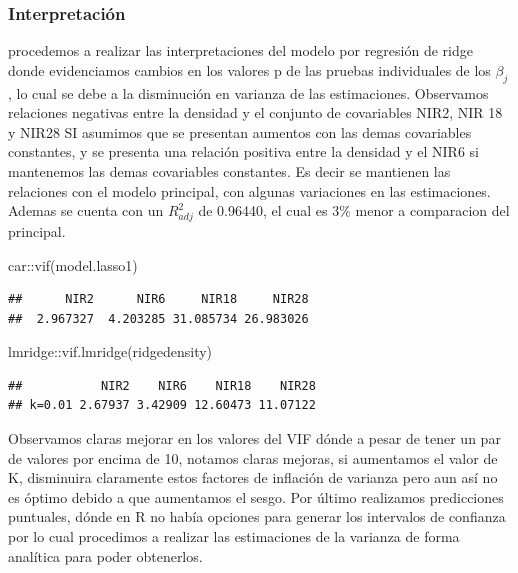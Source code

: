 \documentclass[
]{article}
\newenvironment{Shaded}{\begin{snugshade}}{\end{snugshade}}
\newcommand{\FunctionTok}[1]{\textcolor[rgb]{0.00,0.00,0.00}{#1}}
\newcommand{\NormalTok}[1]{#1}
\newcommand{\SpecialCharTok}[1]{\textcolor[rgb]{0.00,0.00,0.00}{#1}}
\begin{document}
\hypertarget{interpretaciuxf3n-1}{%
\subsubsection{Interpretación}\label{interpretaciuxf3n-1}}

procedemos a realizar las interpretaciones del modelo por regresión de
ridge donde evidenciamos cambios en los valores p de las pruebas
individuales de los \(\beta_{j}\), lo cual se debe a la disminución en
varianza de las estimaciones. Observamos relaciones negativas entre la
densidad y el conjunto de covariables NIR2, NIR 18 y NIR28 SI asumimos
que se presentan aumentos con las demas covariables constantes, y se
presenta una relación positiva entre la densidad y el NIR6 si mantenemos
las demas covariables constantes. Es decir se mantienen las relaciones
con el modelo principal, con algunas variaciones en las estimaciones.
Ademas se cuenta con un \(R^2_{adj}\) de 0.96440, el cual es \(3\%\)
menor a comparacion del principal.

\begin{Shaded}
\begin{Highlighting}[]
\NormalTok{car}\SpecialCharTok{::}\FunctionTok{vif}\NormalTok{(model.lasso1)}
\end{Highlighting}
\end{Shaded}

\begin{verbatim}
##      NIR2      NIR6     NIR18     NIR28 
##  2.967327  4.203285 31.085734 26.983026
\end{verbatim}

\begin{Shaded}
\begin{Highlighting}[]
\NormalTok{lmridge}\SpecialCharTok{::}\FunctionTok{vif.lmridge}\NormalTok{(ridgedensity)}
\end{Highlighting}
\end{Shaded}

\begin{verbatim}
##           NIR2    NIR6    NIR18    NIR28
## k=0.01 2.67937 3.42909 12.60473 11.07122
\end{verbatim}

Observamos claras mejorar en los valores del VIF dónde a pesar de tener
un par de valores por encima de 10, notamos claras mejoras, si
aumentamos el valor de K, disminuira claramente estos factores de
inflación de varianza pero aun así no es óptimo debido a que aumentamos
el sesgo. Por último realizamos predicciones puntuales, dónde en R no
había opciones para generar los intervalos de confianza por lo cual
procedimos a realizar las estimaciones de la varianza de forma analítica
para poder obtenerlos.
\end{document}
